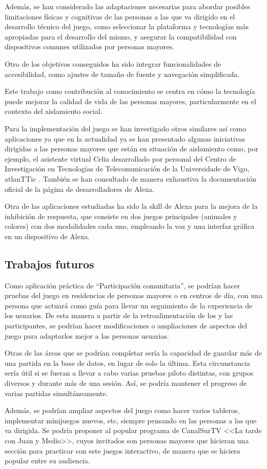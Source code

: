 Además, se han considerado las adaptaciones necesarias para abordar posibles limitaciones físicas y cognitivas de las personas a las que va dirigido en el desarrollo técnico del juego, como seleccionar la plataforma y tecnologías más apropiadas para el desarrollo del mismo, y asegurar la compatibilidad con dispositivos comunes utilizados por personas mayores.

Otro de los objetivos conseguidos ha sido integrar funcionalidades de accesibilidad, como ajustes de tamaño de fuente y navegación simplificada.

Este trabajo como contribución al conocimiento se centra en cómo la tecnología puede mejorar la calidad de vida de las personas mayores, particularmente en el contexto del aislamiento social.

Para la implementación del juego se han investigado otros similares así como aplicaciones ya que en la actualidad ya se han presentado algunas iniciativas dirigidas a las personas mayores que están en situación de aislamiento como, por ejemplo, el asistente virtual Celia desarrollado por personal del Centro de Investigación en Tecnologías de Telecomunicación de la Universidade de Vigo, atlanTTic \parencite{celia-app}. También se han consultado de manera exhaustiva la documentación oficial de la página de desarrolladores de Alexa.

Otra de las aplicaciones estudiadas ha sido la skill de Alexa para la mejora de la inhibición de respuesta, que consiste en dos juegos principales (animales y colores) con dos modalidades cada uno, empleando la voz y una interfaz gráfica en un dispositivo de Alexa.

\subsection{Trabajos futuros}

Como aplicación práctica de \enquote{Participación comunitaria}, se podrían hacer pruebas del juego en residencias de personas mayores o en centros de día, con una persona que actuará como guía para llevar un seguimiento de la experiencia de los usuarios.
De esta manera a partir de la retroalimentación de los y las participantes, se podrían hacer modificaciones o ampliaciones de aspectos del juego para adaptarlos mejor a las personas usuarias.

Otras de las áreas que se podrían completar sería la capacidad de guardar más de una partida en la base de datos, en lugar de solo la última. Esta circunstancia sería útil si se fueran a llevar a cabo varias pruebas piloto distintas, con grupos diversos y durante más de una sesión. Así, se podría mantener el progreso de varias partidas simultáneamente.

Además, se podrían ampliar aspectos del juego como hacer varios tableros, implementar minijuegos nuevos, etc, siempre pensando en las personas a las que va dirigida. Se podría proponer al popular programa de CanalSurTV <<La tarde con Juan y Medio>>, cuyos invitados son personas mayores que hicieran una sección para practicar con este juegos interactivo, de manera que se hiciera popular entre su audiencia.
